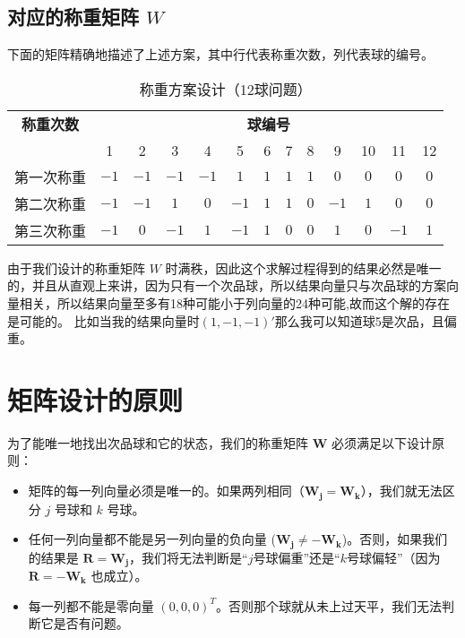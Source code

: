 \documentclass[12pt, a4paper]{ctexart}
\begin{document}
\subsection*{对应的称重矩阵 $W$}
下面的矩阵精确地描述了上述方案，其中行代表称重次数，列代表球的编号。
\begin{table}[h]
    \centering
    \caption{称重方案设计（12球问题）}
    \begin{tabular}{|c|cccccccccccc|}
    \hline
    \textbf{称重次数} & \multicolumn{12}{c|}{\textbf{球编号}} \\
    \cline{2-13}
     & 1 & 2 & 3 & 4 & 5 & 6 & 7 & 8 & 9 & 10 & 11 & 12 \\
    \hline
    第一次称重 & $-1$ & $-1$ & $-1$ & $-1$ & $1$ & $1$ & $1$ & $1$ & $0$ & $0$ & $0$ & $0$ \\
    第二次称重 & $-1$ & $-1$ & $1$ & $0$ & $-1$ & $1$ & $1$ & $0$ & $-1$ & $1$ & $0$ & $0$ \\
    第三次称重 & $-1$ & $0$ & $-1$ & $1$ & $-1$ & $1$ & $0$ & $0$ & $1$ & $0$ & $-1$ & $1$ \\
    \hline
    \end{tabular}
    \end{table}
由于我们设计的称重矩阵 $W$ 时满秩，因此这个求解过程得到的结果必然是唯一的，并且从直观上来讲，因为只有一个次品球，所以结果向量只与次品球的方案向量相关，所以结果向量至多有18种可能小于列向量的24种可能,故而这个解的存在是可能的。
比如当我的结果向量时\((1,-1,-1)'\)那么我可以知道球5是次品，且偏重。


\section{矩阵设计的原则}

为了能唯一地找出次品球和它的状态，我们的称重矩阵 $\mathbf{W}$ 必须满足以下设计原则：

\begin{itemize}
    
    
    \item
    矩阵的每一列向量必须是唯一的。如果两列相同（$\mathbf{W_j} = \mathbf{W_k}$），我们就无法区分 $j$ 号球和 $k$ 号球。

    \item
    任何一列向量都不能是另一列向量的负向量 ($\mathbf{W_j} \neq -\mathbf{W_k}$)。否则，如果我们的结果是 $\mathbf{R} = \mathbf{W_j}$，我们将无法判断是“$j$号球偏重”还是“$k$号球偏轻”（因为 $\mathbf{R} = -\mathbf{W_k}$ 也成立）。

    \item
    每一列都不能是零向量 $(0,0,0)^T$。否则那个球就从未上过天平，我们无法判断它是否有问题。
    
    \end{itemize}
\end{document}
